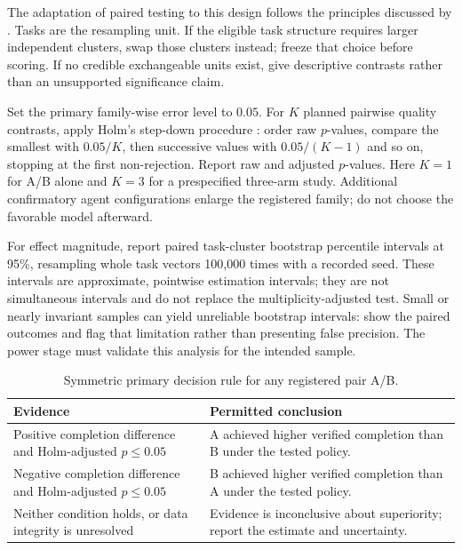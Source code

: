 The adaptation of paired testing to this design follows the principles discussed
by \citet{dror2018}. Tasks are the resampling unit. If the eligible task structure
requires larger independent clusters, swap those clusters instead; freeze that
choice before scoring. If no credible exchangeable units exist, give descriptive
contrasts rather than an unsupported significance claim.

Set the primary family-wise error level to $0.05$. For $K$ planned pairwise
quality contrasts, apply Holm's step-down procedure \citep{holm1979}: order raw
$p$-values, compare the smallest with $0.05/K$, then successive values with
$0.05/(K-1)$ and so on, stopping at the first non-rejection. Report raw and
adjusted $p$-values. Here $K=1$ for A/B alone and $K=3$ for a prespecified
three-arm study. Additional confirmatory agent configurations enlarge the
registered family; do not choose the favorable model afterward.

For effect magnitude, report paired task-cluster bootstrap percentile intervals
at 95\%, resampling whole task vectors 100,000 times with a recorded seed.
These intervals are approximate, pointwise estimation intervals; they are not
simultaneous intervals and do not replace the multiplicity-adjusted test.
Small or nearly invariant samples can yield unreliable bootstrap intervals:
show the paired outcomes and flag that limitation rather than presenting false
precision. The power stage must validate this analysis for the intended sample.

\begin{table}[htbp]
\centering\small
\caption{Symmetric primary decision rule for any registered pair A/B.}
\label{tab:decisions}
\begin{tabularx}{\textwidth}{@{}Y Y@{}}
\toprule
Evidence & Permitted conclusion \\
\midrule
Positive completion difference and Holm-adjusted $p\leq0.05$ & A achieved higher verified completion than B under the tested policy. \\
\addlinespace
Negative completion difference and Holm-adjusted $p\leq0.05$ & B achieved higher verified completion than A under the tested policy. \\
\addlinespace
Neither condition holds, or data integrity is unresolved & Evidence is inconclusive about superiority; report the estimate and uncertainty. \\
\bottomrule
\end{tabularx}
\end{table}

